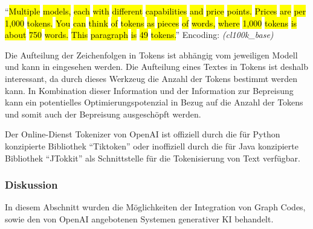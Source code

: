\enquote{\hl{Multiple}\hl{ models}\hl{,}\hl{ each}\hl{ with}\hl{ different}\hl{ capabilities}\hl{ and}\hl{ price}\hl{ points}\hl{.}\hl{ Prices}\hl{ are}\hl{ per}\hl{ }\hl{1}\hl{,}\hl{000}\hl{ tokens}\hl{.}\hl{ You}\hl{ can}\hl{ think}\hl{ of}\hl{ tokens}\hl{ as}\hl{ pieces}\hl{ of}\hl{ words}\hl{,}\hl{ where}\hl{ }\hl{1}\hl{,}\hl{000}\hl{ tokens}\hl{ is}\hl{ about}\hl{ }\hl{750}\hl{ words}\hl{.}\hl{ This}\hl{ paragraph}\hl{ is}\hl{ }\hl{49}\hl{ tokens}\hl{.}} Encoding: \textit{(cl100k\_base)} \cite{openai-model-tiktoken}

Die Aufteilung der Zeichenfolgen in Tokens ist abhängig vom jeweiligen Modell und kann in \cite{openai-model-tiktoken} eingesehen werden.
Die Aufteilung eines Textes in Tokens ist deshalb interessant, da durch dieses Werkzeug die Anzahl der Tokens bestimmt werden kann.
In Kombination dieser Information und der Information zur Bepreisung kann ein potentielles Optimierungspotenzial in Bezug auf die Anzahl der Tokens und somit auch der Bepreisung ausgeschöpft werden.

Der Online-Dienst Tokenizer von OpenAI ist offiziell durch die für Python konzipierte Bibliothek \enquote{Tiktoken} \cite{openai-python-tiktoken} oder inoffiziell durch die für Java konzipierte Bibliothek \enquote{JTokkit} \cite{openai-java-jtokkit} als Schnittstelle für die Tokenisierung von Text verfügbar.

\subsubsection{Diskussion}
\label{sec2:sota:subsubsec:fz2:discussion}
In diesem Abschnitt wurden die Möglichkeiten der Integration von Graph Codes, sowie den von OpenAI angebotenen Systemen generativer KI behandelt.

